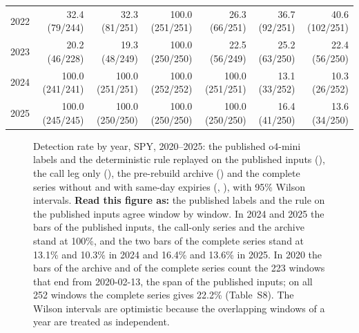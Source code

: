 \begin{table}[!htbp]
\begin{tabular}{@{}lrrrrrr@{}}
2022 & 32.4 (79/244) & 32.3 (81/251) & 100.0 (251/251) & 26.3 (66/251) & 36.7 (92/251) & 40.6 (102/251) \\
2023 & 20.2 (46/228) & 19.3 (48/249) & 100.0 (250/250) & 22.5 (56/249) & 25.2 (63/250) & 22.4 (56/250) \\
2024 & 100.0 (241/241) & 100.0 (251/251) & 100.0 (252/252) & 100.0 (251/251) & 13.1 (33/252) & 10.3 (26/252) \\
2025 & 100.0 (245/245) & 100.0 (250/250) & 100.0 (250/250) & 100.0 (250/250) & 16.4 (41/250) & 13.6 (34/250) \\
\bottomrule
\end{tabular}
\end{table}

\begin{figure}[!htbp]
\centering
\resultfigure{\figReplay}
\caption{Detection rate by year, SPY, 2020--2025: the published o4-mini labels and the deterministic rule replayed on the published inputs (), the call leg only (), the pre-rebuild archive () and the complete series without and with same-day expiries (, ), with 95\% Wilson intervals. \textbf{Read this figure as:} the published labels and the rule on the published inputs agree window by window. In 2024 and 2025 the bars of the published inputs, the call-only series and the archive stand at 100\%, and the two bars of the complete series stand at 13.1\% and 10.3\% in 2024 and 16.4\% and 13.6\% in 2025. In 2020 the bars of the archive and of the complete series count the 223 windows that end from 2020-02-13, the span of the published inputs; on all 252 windows the complete series gives 22.2\% (Table~S8). The Wilson intervals are optimistic because the overlapping windows of a year are treated as independent.}
\label{fig:replay}
\end{figure}


